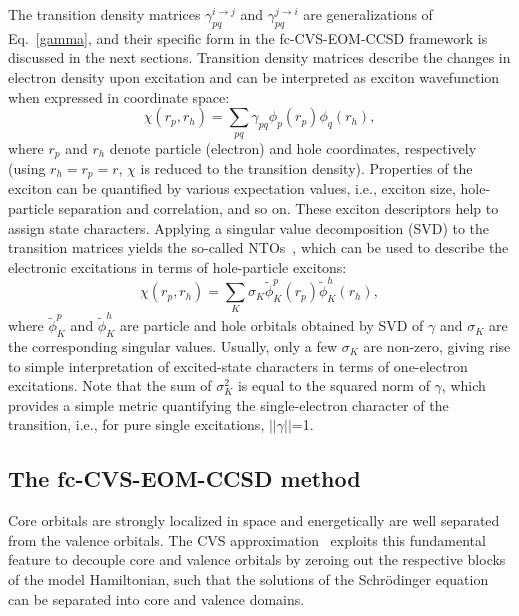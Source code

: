 \documentclass[journal=jctcce,manuscript=article]{achemso}
\begin{document}
The transition density matrices $\gamma^{i\to j}_{pq}$ and $\gamma^{j\to i}_{pq}$ are generalizations of Eq.~\eqref{gamma}, and their specific form in the fc-CVS-EOM-CCSD framework is discussed in the next sections.
Transition density matrices describe  the changes in electron density upon excitation and 
can be interpreted as exciton wavefunction\cite{Luzanov:TDM-1:76,Luzanov:DMRev:12,Plasser2012,Plasser2014}
when expressed in coordinate space:
\begin{equation}
\chi(r_p,r_h) = \sum_{pq} \gamma_{pq} \phi_p(r_p) \phi_q(r_h),
\end{equation}
where $r_p$ and $r_h$ denote particle (electron) and hole coordinates,
respectively (using $r_h=r_p=r$, $\chi$ is reduced to the transition density).  
Properties of the exciton can be quantified by various expectation
values, i.e., exciton size, hole-particle separation and correlation, and so on.
These exciton descriptors help to assign state characters\cite{Plasser2012,Plasser2014,Plasser2014:1}.
Applying a singular value decomposition (SVD) to the transition matrices yields the so-called NTOs~\cite{Martin2003,Plasser2012,Plasser2014,Plasser2014:1,Bappler2014,Mewes2018}, which can be used to
describe the electronic excitations in terms of hole-particle excitons:
\begin{equation}
\chi(r_p,r_h) = \sum_K \sigma_K  \tilde{\phi}^p_K(r_p) \tilde{\phi}^h_K(r_h),
\end{equation}
where $\tilde \phi^p_K$ and $\tilde \phi^h_K$ are particle and hole orbitals obtained by SVD 
of $\gamma$ and $\sigma_K$  
are the corresponding  singular values. Usually, only a few
$\sigma_K$ are non-zero, giving rise to simple interpretation of excited-state characters
in terms of one-electron excitations. Note that the sum of $\sigma_K^2$ is equal to the squared norm of $\gamma$, which provides a simple metric quantifying the single-electron character of the transition, i.e., for pure single excitations, $||\gamma||$=1. 

\subsection{The fc-CVS-EOM-CCSD method}

Core orbitals are strongly localized in space and energetically are well separated from the valence orbitals.
The CVS approximation~\cite{Cederbaum1980} exploits this fundamental feature to decouple core and valence orbitals by zeroing out the respective blocks of the model Hamiltonian, such that the solutions of the Schr\"odinger equation can be separated into core and valence domains.
\end{document}
